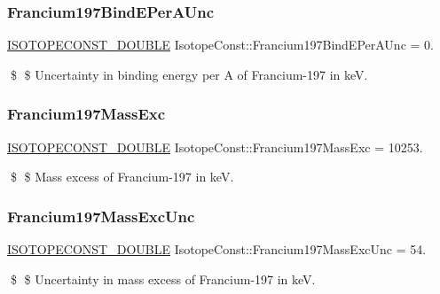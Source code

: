 \subsubsection{\texorpdfstring{Francium197\+Bind\+E\+Per\+A\+Unc}{Francium197BindEPerAUnc}}
{\footnotesize\ttfamily \mbox{\hyperlink{group___isotope_const-_macros_ga8f45a7272ce02c0b4c65c44636ed719a}{I\+S\+O\+T\+O\+P\+E\+C\+O\+N\+S\+T\+\_\+\+D\+O\+U\+B\+LE}} Isotope\+Const\+::\+Francium197\+Bind\+E\+Per\+A\+Unc = 0.}

\$ \$ Uncertainty in binding energy per A of Francium-\/197 in keV. \mbox{\label{group___isotope_const-_francium-_fr197_ga01ddf7412a86939dea2f029c7db1dd35}} 
\subsubsection{\texorpdfstring{Francium197\+Mass\+Exc}{Francium197MassExc}}
{\footnotesize\ttfamily \mbox{\hyperlink{group___isotope_const-_macros_ga8f45a7272ce02c0b4c65c44636ed719a}{I\+S\+O\+T\+O\+P\+E\+C\+O\+N\+S\+T\+\_\+\+D\+O\+U\+B\+LE}} Isotope\+Const\+::\+Francium197\+Mass\+Exc = 10253.}

\$ \$ Mass excess of Francium-\/197 in keV. \mbox{\label{group___isotope_const-_francium-_fr197_ga7e231ac12df5ba165982027dc38c6af2}} 
\subsubsection{\texorpdfstring{Francium197\+Mass\+Exc\+Unc}{Francium197MassExcUnc}}
{\footnotesize\ttfamily \mbox{\hyperlink{group___isotope_const-_macros_ga8f45a7272ce02c0b4c65c44636ed719a}{I\+S\+O\+T\+O\+P\+E\+C\+O\+N\+S\+T\+\_\+\+D\+O\+U\+B\+LE}} Isotope\+Const\+::\+Francium197\+Mass\+Exc\+Unc = 54.}

\$ \$ Uncertainty in mass excess of Francium-\/197 in keV. \mbox{\label{group___isotope_const-_francium-_fr197_gaab9926c348397b20c044c12451a51393}} 
